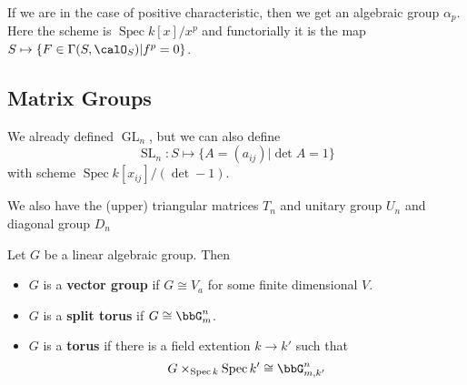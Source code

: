 \documentclass[12pt]{article}
\DeclareMathOperator{\1}{\mathbbm{1}}
\DeclareMathOperator{\GL}{GL}
\DeclareMathOperator{\Spec}{Spec}
\begin{document}
\begin{ex}
	If we are in the case of positive characteristic, then we get an algebraic group $\alpha_p$. Here the scheme is $\Spec k[x]/x^p$ and functorially it 
	is the map $S\mapsto \{F\in\Gamma(S,\calO_S)|f^p=0\}$.
\end{ex}

\subsection{Matrix Groups}
We already defined $\GL_n$, but we can also define 
\[\operatorname{SL}_n:S\mapsto\{A=(a_{ij})|\det A=1\}\]
with scheme $\Spec k[x_{ij}]/(\det-1)$.

We also have the (upper) triangular matrices $T_n$ and unitary group $U_n$ and diagonal group $D_n$

\begin{defn}
	Let $G$ be a linear algebraic group. Then 
	\begin{itemize}
		\item $G$ is a \textbf{vector group} if $G\cong V_a$ for some finite dimensional $V$.
		\item $G$ is a \textbf{split torus} if $G\cong \bbG_m^n$.
		\item $G$ is a \textbf{torus} if there is a field extention $k\to k'$ such that 
		\[G\times_{\Spec k}\Spec k'\cong \bbG^n_{m,k'}\]
	\end{itemize}
\end{defn}
\end{document}
